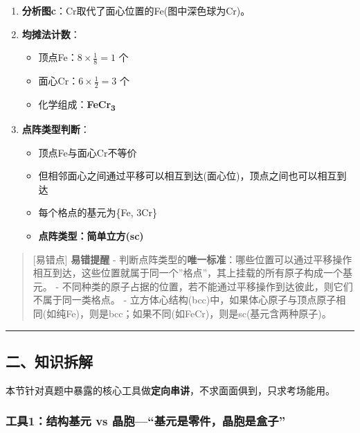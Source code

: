 \begin{enumerate}
\def\labelenumi{\arabic{enumi}.}
\tightlist
\item
  \textbf{分析图c}：Cr取代了面心位置的Fe(图中深色球为Cr)。
\item
  \textbf{均摊法计数}：

  \begin{itemize}
  \tightlist
  \item
    顶点Fe：\(8 \times \frac{1}{8} = 1\) 个
  \item
    面心Cr：\(6 \times \frac{1}{2} = 3\) 个
  \item
    化学组成：\textbf{FeCr\textsubscript{3}}
  \end{itemize}
\item
  \textbf{点阵类型判断}：

  \begin{itemize}
  \tightlist
  \item
    顶点Fe与面心Cr不等价
  \item
    但相邻面心之间通过平移可以相互到达(面心位)，顶点之间也可以相互到达
  \item
    每个格点的基元为\{Fe, 3Cr\}
  \item
    \textbf{点阵类型：简单立方(sc)}
  \end{itemize}
\end{enumerate}

\begin{quote}
{[}易错点{]} \textbf{易错提醒}
- 判断点阵类型的\textbf{唯一标准}：哪些位置可以通过平移操作相互到达，这些位置就属于同一个''格点''，其上挂载的所有原子构成一个基元。
- 不同种类的原子占据的位置，若不能通过平移操作到达彼此，则它们不属于同一类格点。
- 立方体心结构(bcc)中，如果体心原子与顶点原子相同(如纯Fe)，则是bcc；如果不同(如FeCr)，则是sc(基元含两种原子)。
\end{quote}

\begin{center}\rule{0.5\linewidth}{0.5pt}\end{center}

\subsection{二、知识拆解}\label{ux4e8cux77e5ux8bc6ux62c6ux89e3-2}

本节针对真题中暴露的核心工具做\textbf{定向串讲}，不求面面俱到，只求考场能用。

\subsubsection{工具1：结构基元 vs 晶胞---``基元是零件，晶胞是盒子''}\label{ux5de5ux51771ux7ed3ux6784ux57faux5143-vs-ux6676ux80deux57faux5143ux662fux96f6ux4ef6ux6676ux80deux662fux76d2ux5b50}

